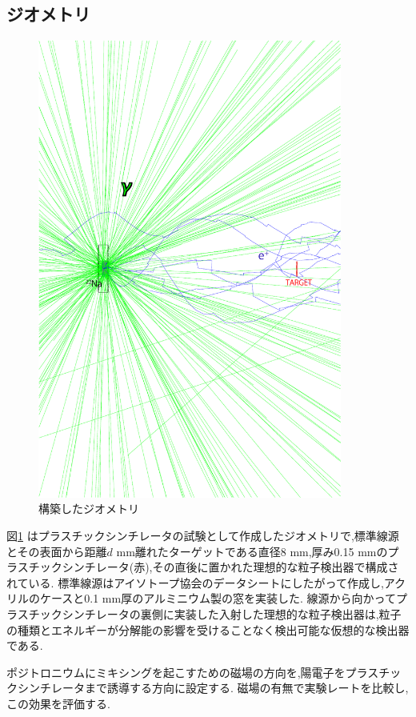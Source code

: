 \subsection{ジオメトリ}

\begin{figure}[!tbp]
	\centering
		\includegraphics[width=10cm]{img/test1_geometry.pdf}
	\caption{構築したジオメトリ}
	\label{test1_geometry}
\end{figure}

図\ref{test1_geometry} はプラスチックシンチレータの試験として作成したジオメトリで,標準線源とその表面から距離$d$ mm離れたターゲットである直径8 mm,厚み0.15 mmのプラスチックシンチレータ(赤),その直後に置かれた理想的な粒子検出器で構成されている.
標準線源はアイソトープ協会のデータシートにしたがって作成し,アクリルのケースと0.1 mm厚のアルミニウム製の窓を実装した.
線源から向かってプラスチックシンチレータの裏側に実装した入射した理想的な粒子検出器は,粒子の種類とエネルギーが分解能の影響を受けることなく検出可能な仮想的な検出器である.

ポジトロニウムにミキシングを起こすための磁場の方向を,陽電子をプラスチックシンチレータまで誘導する方向に設定する.
磁場の有無で実験レートを比較し,この効果を評価する.


